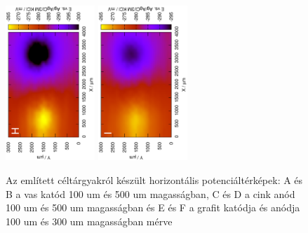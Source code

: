 \begin{figure}
\includegraphics[width=0.3\textwidth, angle=-90]{img/mérések/grafit_h_100.eps}
\includegraphics[width=0.3\textwidth, angle=-90]{img/mérések/grafit_h_300.eps}

\caption{Az említett céltárgyakról készült horizontális potenciáltérképek:
A és B a vas katód 100 um és 500 um magasságban, C és D a cink anód 100 um és 500 um magasságban és E és F a grafit katódja és anódja 100 um és 300 um magasságban mérve}
\label{fig:horizontális}
\end{figure}


